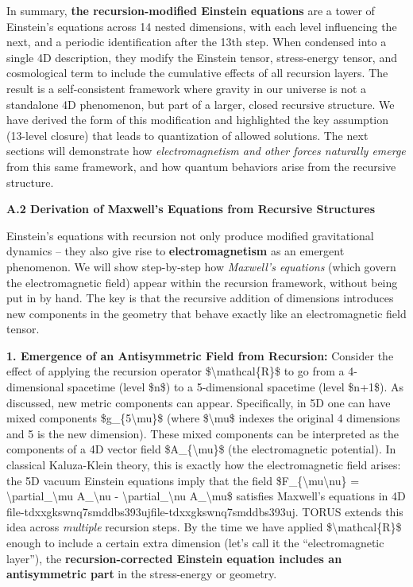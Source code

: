 In summary, \textbf{the recursion-modified Einstein equations} are a
tower of Einstein's equations across 14 nested dimensions, with each
level influencing the next, and a periodic identification after the 13th
step. When condensed into a single 4D description, they modify the
Einstein tensor, stress-energy tensor, and cosmological term to include
the cumulative effects of all recursion layers​. The result is a
self-consistent framework where gravity in our universe is not a
standalone 4D phenomenon, but part of a larger, closed recursive
structure. We have derived the form of this modification and highlighted
the key assumption (13-level closure) that leads to quantization of
allowed solutions. The next sections will demonstrate how
\emph{electromagnetism and other forces naturally emerge} from this same
framework, and how quantum behaviors arise from the recursive structure.

\textbf{A.2 Derivation of Maxwell's Equations from Recursive Structures}

Einstein's equations with recursion not only produce modified
gravitational dynamics -- they also give rise to
\textbf{electromagnetism} as an emergent phenomenon. We will show
step-by-step how \emph{Maxwell's equations} (which govern the
electromagnetic field) appear within the recursion framework, without
being put in by hand. The key is that the recursive addition of
dimensions introduces new components in the geometry that behave exactly
like an electromagnetic field tensor.

\textbf{1. Emergence of an Antisymmetric Field from Recursion:} Consider
the effect of applying the recursion operator
\$\textbackslash{}mathcal\{R\}\$ to go from a 4-dimensional spacetime
(level \$n\$) to a 5-dimensional spacetime (level \$n+1\$). As
discussed, new metric components can appear. Specifically, in 5D one can
have mixed components \$g\_\{5\textbackslash{}mu\}\$ (where
\$\textbackslash{}mu\$ indexes the original 4 dimensions and 5 is the
new dimension). These mixed components can be interpreted as the
components of a 4D vector field \$A\_\{\textbackslash{}mu\}\$ (the
electromagnetic potential). In classical Kaluza-Klein theory, this is
exactly how the electromagnetic field arises: the 5D vacuum Einstein
equations imply that the field
\$F\_\{\textbackslash{}mu\textbackslash{}nu\} =
\textbackslash{}partial\_\textbackslash{}mu A\_\textbackslash{}nu -
\textbackslash{}partial\_\textbackslash{}nu A\_\textbackslash{}mu\$
satisfies Maxwell's equations in
4D​file-tdxxgkswnq7smddbs393uj​file-tdxxgkswnq7smddbs393uj. TORUS
extends this idea across \emph{multiple} recursion steps. By the time we
have applied \$\textbackslash{}mathcal\{R\}\$ enough to include a
certain extra dimension (let's call it the ``electromagnetic layer''),
the \textbf{recursion-corrected Einstein equation includes an
antisymmetric part} in the stress-energy or geometry.

